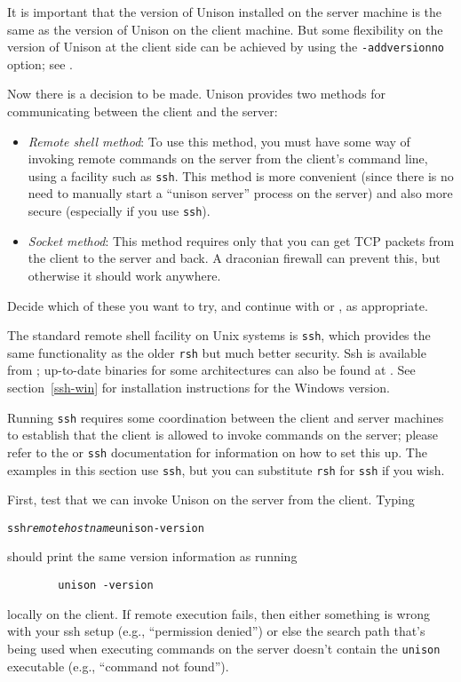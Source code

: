 \documentclass{article}
\newcommand{\NT}[1]{\textit{#1}}
\begin{document}
It is important that the version of Unison installed on the server
machine is the same as the version of Unison on the client machine.
But some flexibility on the version of Unison at the client side can
be achieved by using the \verb|-addversionno| option; see 
.

Now there is a decision to be made.  Unison provides two methods for
communicating between the client and the server:
\begin{itemize}
\item {\em Remote shell method}: To use this method, you must have
  some way of invoking remote commands on the server from the client's
  command line, using a facility such as \verb|ssh|.
  This method is more convenient (since there is no need to manually
  start a ``unison server'' process on the server) and also more
  secure (especially if you use \verb|ssh|).

\item {\em Socket method}: This method requires only that you can get
  TCP packets from the client to the server and back.  A draconian 
  firewall can prevent this, but otherwise it should work anywhere.
\end{itemize}

Decide which of these you want to try, and continue with
 or
, as appropriate.



The standard remote shell facility on Unix systems is \verb|ssh|, which provides the
same functionality as the older \verb|rsh| but much better security.  Ssh is available from
; up-to-date binaries for some
architectures can also be found at
.  See section~\ref{ssh-win}
for installation instructions for the Windows version.

Running
\verb|ssh| requires some coordination between the client and server
machines to establish that the client is allowed to invoke commands on
the server; please refer to the or \verb|ssh| documentation
for information on how to set this up.  The examples in this section
use \verb|ssh|, but you can substitute \verb|rsh| for \verb|ssh| if
you wish.

First, test that we can invoke Unison on the server from the client.
Typing
\begin{alltt}
        ssh \NT{remotehostname} unison -version
\end{alltt}
should print the same version information as running
\begin{verbatim}
        unison -version
\end{verbatim}
locally on the client.  If remote execution fails, then either
something is wrong with your ssh setup (e.g., ``permission denied'')
or else the search path that's being used when executing commands on
the server doesn't contain the \verb|unison| executable (e.g.,
``command not found'').
\end{document}
